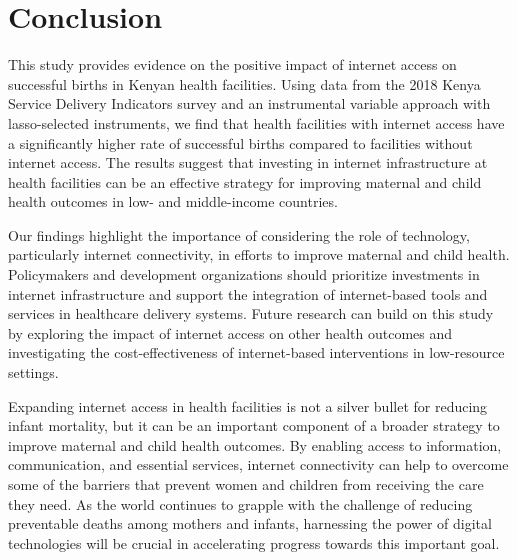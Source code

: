 \documentclass[12pt]{article}
\begin{document}
\section{Conclusion}
This study provides evidence on the positive impact of internet access on successful births in Kenyan health facilities. Using data from the 2018 Kenya Service Delivery Indicators survey and an instrumental variable approach with lasso-selected instruments, we find that health facilities with internet access have a significantly higher rate of successful births compared to facilities without internet access. The results suggest that investing in internet infrastructure at health facilities can be an effective strategy for improving maternal and child health outcomes in low- and middle-income countries.

Our findings highlight the importance of considering the role of technology, particularly internet connectivity, in efforts to improve maternal and child health. Policymakers and development organizations should prioritize investments in internet infrastructure and support the integration of internet-based tools and services in healthcare delivery systems. Future research can build on this study by exploring the impact of internet access on other health outcomes and investigating the cost-effectiveness of internet-based interventions in low-resource settings.

Expanding internet access in health facilities is not a silver bullet for reducing infant mortality, but it can be an important component of a broader strategy to improve maternal and child health outcomes. By enabling access to information, communication, and essential services, internet connectivity can help to overcome some of the barriers that prevent women and children from receiving the care they need. As the world continues to grapple with the challenge of reducing preventable deaths among mothers and infants, harnessing the power of digital technologies will be crucial in accelerating progress towards this important goal.



\end{document}
